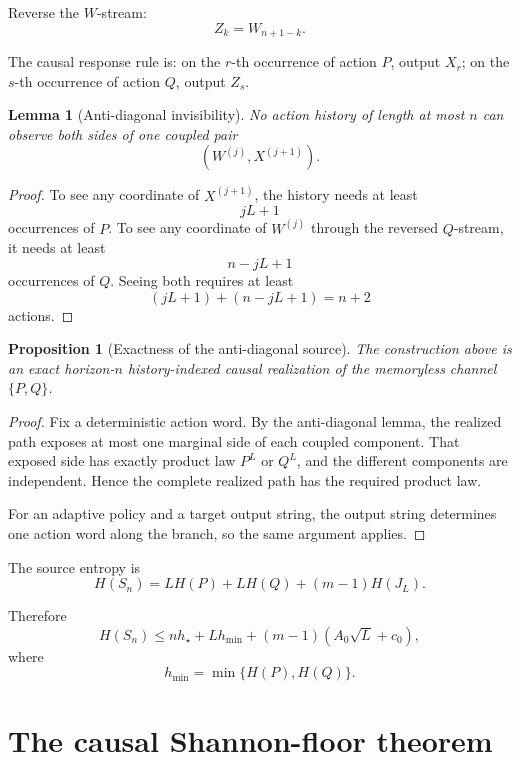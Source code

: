 \documentclass[11pt,a4paper]{article}
\newtheorem{proposition}[theorem]{Proposition}
\newtheorem{lemma}[theorem]{Lemma}
\newcommand{\1}{\mathbf 1}
\begin{document}
Reverse the \(W\)-stream:
\[
Z_k=W_{n+1-k}.
\tag{16.2}
\]

The causal response rule is:
on the \(r\)-th occurrence of action \(P\), output \(X_r\);
on the \(s\)-th occurrence of action \(Q\), output \(Z_s\).

\begin{lemma}[Anti-diagonal invisibility]
No action history of length at most \(n\) can observe both sides of one
coupled pair
\[
(W^{(j)},X^{(j+1)}).
\]
\end{lemma}

\begin{proof}
To see any coordinate of \(X^{(j+1)}\), the history needs at least
\[
jL+1
\]
occurrences of \(P\).
To see any coordinate of \(W^{(j)}\) through the reversed \(Q\)-stream,
it needs at least
\[
n-jL+1
\]
occurrences of \(Q\).
Seeing both requires at least
\[
(jL+1)+(n-jL+1)=n+2
\]
actions.
\end{proof}

\begin{proposition}[Exactness of the anti-diagonal source]
The construction above is an exact horizon-\(n\) history-indexed causal
realization of the memoryless channel \(\{P,Q\}\).
\end{proposition}

\begin{proof}
Fix a deterministic action word.
By the anti-diagonal lemma, the realized path exposes at most one
marginal side of each coupled component.
That exposed side has exactly product law \(P^L\) or \(Q^L\), and the
different components are independent.
Hence the complete realized path has the required product law.

For an adaptive policy and a target output string, the output string
determines one action word along the branch, so the same argument
applies.
\end{proof}

The source entropy is
\[
H(S_n)
=
LH(P)+LH(Q)+(m-1)H(J_L).
\tag{16.3}
\]

Therefore
\[
\boxed{
H(S_n)
\le
nh_\star
+
Lh_{\min}
+
(m-1)(A_0\sqrt L+c_0),
}
\tag{16.4}
\]
where
\[
h_{\min}=\min\{H(P),H(Q)\}.
\]


\section{The causal Shannon-floor theorem}
\end{document}
